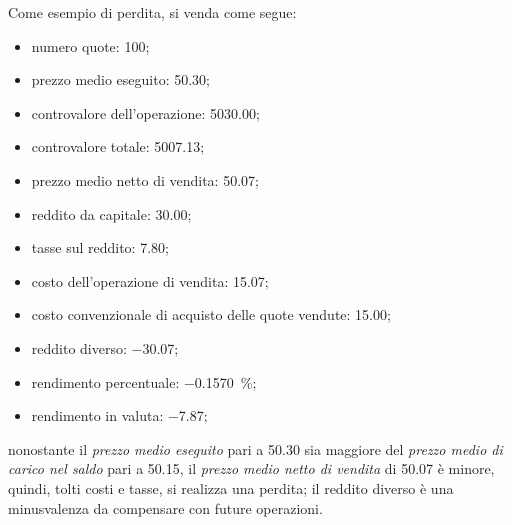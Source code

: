 \documentclass[12pt,a4paper]{article}
\newcommand{\Eur}[1]{\SI{#1}{\text{\euro{}}}}
\begin{document}
Come esempio di perdita, si venda come segue:
\begin{itemize}
\item numero quote: \num{100};
\item prezzo medio eseguito: \Eur{50,30};
\item controvalore dell'operazione: \Eur{5030,00};
\item controvalore totale: \Eur{5007,13};
\item prezzo medio netto di vendita: \Eur{50,07};

\item reddito da capitale: \Eur{30,00};
\item tasse sul reddito: \Eur{7,80};
\item costo dell'operazione di vendita: \Eur{15,07};
\item costo convenzionale di acquisto delle quote vendute: \Eur{15,00};
\item reddito diverso: \Eur{-30,07};

\item rendimento percentuale: \SI{-0,1570}{\percent};
\item rendimento in valuta: \Eur{-7,87};
\end{itemize}
nonostante il \emph{prezzo medio eseguito} pari a \Eur{50,30} sia maggiore del \emph{prezzo medio di
   carico nel saldo}  pari a \Eur{50,15}, il  \emph{prezzo medio netto di vendita}  di \Eur{50,07} è
minore, quindi, tolti costi e tasse, si realizza  una perdita; il reddito diverso è una minusvalenza
da compensare con future operazioni.

\end{document}
